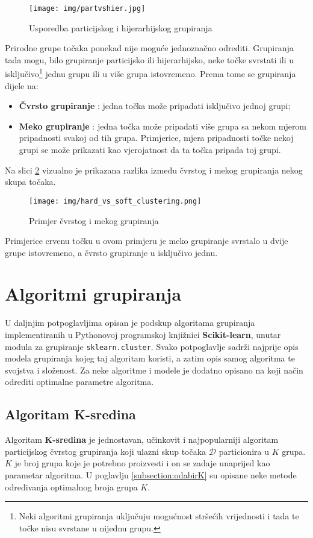 \documentclass[times, utf8, zavrsni]{fer}
\begin{document}
\begin{figure}[H]
    \centering
    \texttt{[image: img/partvshier.jpg]}
    \caption{Usporedba particijskog i hijerarhijskog grupiranja \citep{viktormysko}}
    \label{fig:partvshier}
\end{figure}

Prirodne grupe točaka ponekad nije moguće jednoznačno odrediti. Grupiranja tada mogu, bilo grupiranje particijsko ili hijerarhijsko, neke točke svrstati ili u isključivo\footnote{Neki algoritmi grupiranja uključuju mogućnost stršećih vrijednosti i tada te točke nisu svrstane u nijednu grupu.} jednu grupu ili u više grupa istovremeno. Prema tome se grupiranja dijele na:
\begin{itemize}
    \item \textbf{Čvrsto grupiranje} : jedna točka može pripadati isključivo jednoj grupi;
    \item \textbf{Meko grupiranje} : jedna točka može pripadati više grupa sa nekom mjerom pripadnosti svakoj od tih grupa. Primjerice, mjera pripadnosti točke nekoj grupi se može prikazati kao vjerojatnost da ta točka pripada toj grupi.
\end{itemize}
Na slici \ref{fig:hard_vs_soft_clustering} vizualno je prikazana razlika između čvrstog i mekog grupiranja nekog skupa točaka. 
\begin{figure}[H]
    \centering
    \texttt{[image: img/hard\_vs\_soft\_clustering.png]}
    \caption{Primjer čvrstog i mekog grupiranja}
    \label{fig:hard_vs_soft_clustering}
\end{figure} Primjerice crvenu točku u ovom primjeru je meko grupiranje svrstalo u dvije grupe istovremeno, a čvrsto grupiranje u isključivo jednu.

\chapter{Algoritmi grupiranja}
\label{clusteringalgos}
U daljnjim potpoglavljima opisan je podskup algoritama grupiranja implementiranih u Pythonovoj programskoj knjižnici \textbf{Scikit-learn}, unutar modula za grupiranje \texttt{sklearn.cluster}. Svako potpoglavlje sadrži najprije opis modela grupiranja kojeg taj algoritam koristi, a zatim opis samog algoritma te svojstva i složenost. Za neke algoritme i modele je dodatno opisano na koji način odrediti optimalne parametre algoritma.


\section{Algoritam K-sredina} \label{kmeans}
Algoritam \textbf{K-sredina}  je jednostavan, učinkovit i najpopularniji algoritam particijskog čvrstog grupiranja koji ulazni skup točaka $\mathcal{D}$ particionira u $K$ grupa. $K$ je broj grupa koje je potrebno proizvesti i on se zadaje unaprijed kao parametar algoritma. U poglavlju \ref{subsection:odabirK} su opisane neke metode određivanja optimalnog broja grupa $K$.
\end{document}

